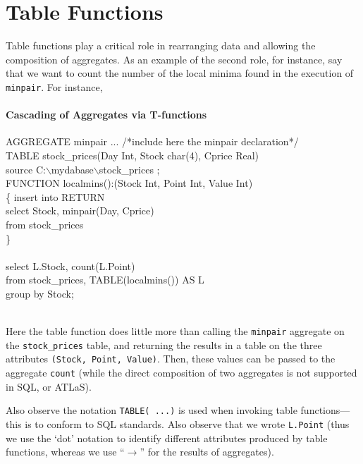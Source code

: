 \clearpage
\section{Table Functions}

Table functions play a critical role in rearranging data and
allowing the composition of aggregates. As an example of the
second role, for instance, say that we want to count the number
of the local minima found in the execution of {\tt minpair}.
For instance,

\paragraph{Cascading of Aggregates via T-functions}
\begin{codedisplay}
\> {AGGREGATE} minpair  ... /*include here the minpair declaration*/\\
\> TABLE stock\_prices(Day Int, Stock char(4), Cprice Real)\\
\>\>\>\>\>\>\>\>\>\>\>source  C:$\backslash$mydabase$\backslash$stock\_prices ;\\

\>FUNCTION localmins():(Stock Int, Point Int, Value Int)\\
\>\> \{ \> insert into RETURN\\
\>\>\>select Stock, minpair(Day, Cprice)\\
\>\>\>\>from stock\_prices\\
\> \>\> \} \\
\>\\
\>select  L.Stock,  count(L.Point)\\
\>\>from  stock\_prices, TABLE(localmins()) AS L\\
\>\>group by Stock; \\
\>\\
\end{codedisplay}

Here the table function does little more than calling the {\tt minpair}
aggregate on the {\tt stock\_prices} table, and returning the results
in a table on the three attributes  {\tt (Stock, Point, Value)}. Then,
these values can be passed to the aggregate {\tt count} (while the direct
composition of two aggregates is not supported in SQL, or ATLaS).

Also observe the notation
{\tt TABLE( ...)} is used when invoking table functions---this is
to conform to SQL standards.
Also observe that we
wrote {\tt L.Point} (thus we use the `dot' notation to identify
different attributes produced by table functions, whereas we use
``$\rightarrow$'' for the results of aggregates).

